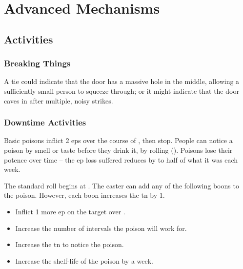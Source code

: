 \chapter{Advanced Mechanisms}

\label{skill_uses}

\section{Activities}

\begin{multicols}{2}

\togglefalse{examplecharacter}

\subsection{Breaking Things}

A tie could indicate that the door has a massive hole in the middle, allowing a sufficiently small person to squeeze through; or it might indicate that the door caves in after multiple, noisy strikes.

\subsection{Downtime Activities}


Basic poisons inflict 2 \glspl{ep} over the course of , then stop.
People can notice a poison by smell or taste before they drink it, by rolling  (\tn[7]).
Poisons lose their potence over time -- the \gls{ep} loss suffered reduces by to half of what it was each week.

The standard roll begins at \tn[7].
The caster can add any of the following boons to the poison.
However, each boon increases the \gls{tn} by 1.

\begin{itemize}
  \item
  Inflict 1 more \gls{ep} on the target over .
  \item
  Increase the number of \glspl{interval} the poison will work for.
  \item
  Increase the \gls{tn} to notice the poison.
  \item
  Increase the shelf-life of the poison by a week.
\end{itemize}


\end{multicols}
